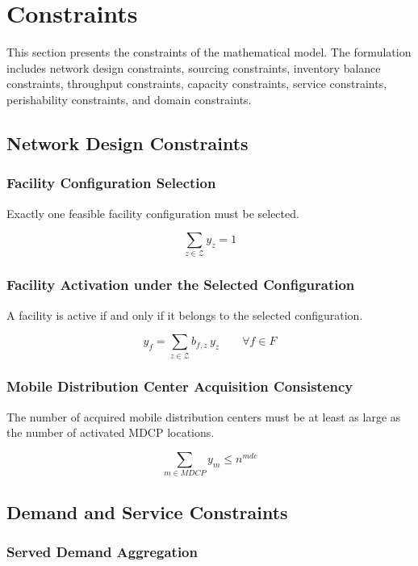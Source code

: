 \documentclass[12pt]{article}
\begin{document}
\newpage

\newpage

\section{Constraints}

This section presents the constraints of the mathematical model. The formulation includes network design constraints, sourcing constraints, inventory balance constraints, throughput constraints, capacity constraints, service constraints, perishability constraints, and domain constraints.

\subsection{Network Design Constraints}

\subsubsection{Facility Configuration Selection}

Exactly one feasible facility configuration must be selected.

\[
\sum_{z \in \mathcal{Z}} y_z = 1
\]

\subsubsection{Facility Activation under the Selected Configuration}

A facility is active if and only if it belongs to the selected configuration.

\[
y_f = \sum_{z \in \mathcal{Z}} b_{f,z}\, y_z
\qquad \forall f \in F
\]

\subsubsection{Mobile Distribution Center Acquisition Consistency}

The number of acquired mobile distribution centers must be at least as large as the number of activated MDCP locations.

\[
\sum_{m \in MDCP} y_m \leq n^{mdc}
\]

\subsection{Demand and Service Constraints}

\subsubsection{Served Demand Aggregation}
\end{document}
